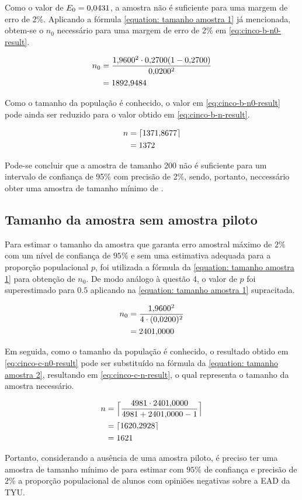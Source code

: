 	Como o valor de $E_0 = \num{0.0431}$, a amostra não é suficiente para uma
	margem de erro de 2\%. Aplicando a fórmula \autoref{equation: tamanho amostra 1} já
	mencionada, obtem-se o $n_0$ necessário para uma margem de erro de 2\%
	em \eqref{eq:cinco-b-n0-result}.

	\begin{align}
		n_0 &= \frac{\num{1.96}^2 \cdot \num{0.27}(1-\num{0.27})}{\num{0.02}^2} \nonumber \\
			&= \label{eq:cinco-b-n0-result}
			   \num{1892.9484}	
	\end{align}

	Como o tamanho da população é conhecido, o valor em
	\eqref{eq:cinco-b-n0-result} pode ainda ser reduzido para o valor obtido
	em \eqref{eq:cinco-b-n-result}.

	\begin{align}
		n &= \lceil \num{1371.8677} \nonumber \rceil \\
		  &= \label{eq:cinco-b-n-result} 
			 1372
	\end{align}

	Pode-se concluir que a amostra de tamanho 200 não é suficiente para um
	intervalo de confiança de 95\% com precisão de 2\%, sendo, portanto,
	neccessário obter uma amostra de tamanho mínimo de \CINCOBnceil.

\subsection{Tamanho da amostra sem amostra piloto}

	Para estimar o tamanho da amostra que garanta erro amostral máximo de
	$2\%$ com um nível de confiança de $95\%$ e sem uma estimativa adequada
	para a proporção populacional $p$, foi utilizada a fórmula da
	\autoref{equation: tamanho amostra 1} para obtenção de $n_0$.  
	De modo análogo à questão 4, o valor de $p$ foi superestimado para $\num{0.5}$ 
	aplicando na \autoref{equation: tamanho amostra 1} supracitada.

	\begin{align}
		n_0 &= \frac{\num{1.96}^2}{4 \cdot (\num{0.02})^2} \nonumber \\
			&= \label{eq:cinco-c-n0-result}
			   \num{2401.0000}
	\end{align}

	Em seguida, como o tamanho da população é conhecido, o resultado obtido
	em \eqref{eq:cinco-c-n0-result} pode ser substituído na fórmula da
	\autoref{equation: tamanho amostra 2}, resultando em \eqref{eq:cinco-c-n-result}, o qual
	representa o tamanho da amostra necessário.

	\begin{align}
		n &= \Big\lceil \frac{4981 \cdot \num{2401.0000}}{4981 + \num{2401.0000} - 1}
		  \nonumber \Big\rceil \\
		  &= \lceil \num{1620.2928} \nonumber \rceil\\
		  &= \label{eq:cinco-c-n-result} 
			 1621
	\end{align}

	Portanto, considerando a ausência de uma amostra piloto, é preciso ter
	uma amostra de tamanho mínimo de \CINCOCnceil para estimar com $95\%$ de
	confiança e precisão de $2\%$ a proporção populacional de alunos com
	opiniões negativas sobre a EAD da TYU.

